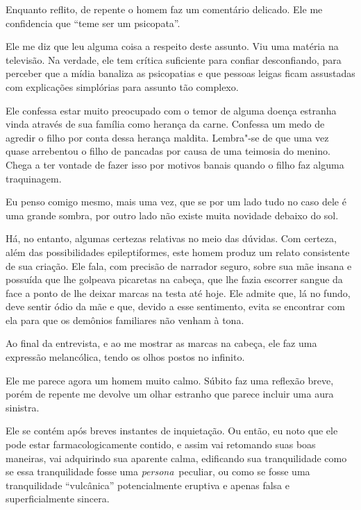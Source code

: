 Enquanto reflito, de repente o homem faz um comentário delicado. Ele me
confidencia que ``teme ser um psicopata''.

Ele me diz que leu alguma coisa a respeito deste assunto. Viu uma
matéria na televisão. Na verdade, ele tem crítica suficiente para
confiar desconfiando, para perceber que a mídia banaliza as psicopatias
e que pessoas leigas ficam assustadas com explicações simplórias para
assunto tão complexo.

Ele confessa estar muito preocupado com o temor de alguma doença
estranha vinda através de sua família como herança da carne. Confessa um
medo de agredir o filho por conta dessa herança maldita. Lembra"-se de
que uma vez quase arrebentou o filho de pancadas por causa de uma
teimosia do menino. Chega a ter vontade de fazer isso por motivos banais
quando o filho faz alguma traquinagem.

\asterisc{}

Eu penso comigo mesmo, mais uma vez, que se por um lado tudo no caso
dele é uma grande sombra, por outro lado não existe muita novidade
debaixo do sol.

Há, no entanto, algumas certezas relativas no meio das dúvidas. Com
certeza, além das possibilidades epileptiformes, este homem produz um
relato consistente de sua criação. Ele fala, com precisão de narrador
seguro, sobre sua mãe insana e possuída que lhe golpeava picaretas na
cabeça, que lhe fazia escorrer sangue da face a ponto de lhe deixar
marcas na testa até hoje. Ele admite que, lá no fundo, deve sentir ódio
da mãe e que, devido a esse sentimento, evita se encontrar com ela para
que os demônios familiares não venham à tona.

Ao final da entrevista, e ao me mostrar as marcas na cabeça, ele faz uma
expressão melancólica, tendo os olhos postos no infinito.

\asterisc{}

Ele me parece agora um homem muito calmo. Súbito faz uma reflexão breve,
porém de repente me devolve um olhar estranho que parece incluir uma
aura sinistra.

Ele se contém após breves instantes de inquietação. Ou então, eu noto
que ele pode estar farmacologicamente contido, e assim vai retomando
suas boas maneiras, vai adquirindo sua aparente calma, edificando sua
tranquilidade como se essa tranquilidade fosse uma
\emph{persona}~peculiar, ou como se fosse uma tranquilidade
``vulcânica'' potencialmente eruptiva e apenas falsa e superficialmente
sincera.


